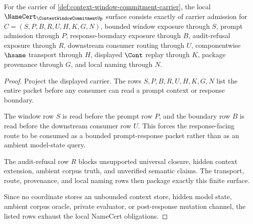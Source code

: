 \begin{theorem}
\label{thm:context-window-commitment-namecert-obligations}
For the carrier of \autoref{def:context-window-commitment-carrier}, the local $\NameCert_{\ContextWindowCommitmentUp}$ surface consists exactly of carrier admission for $C=(S,P,B,R,U,H,K,G,N)$, bounded window exposure through $S$, prompt admission through $P$, response-boundary exposure through $B$, audit-refusal exposure through $R$, downstream consumer routing through $U$, componentwise $\hsame$ transport through $H$, displayed $\Cont$ replay through $K$, package provenance through $G$, and local naming through $N$.
\end{theorem}
\begin{proof}
Project the displayed carrier. The rows $S,P,B,R,U,H,K,G,N$ list the entire packet before any consumer can read a prompt context or response boundary.

The window row $S$ is read before the prompt row $P$, and the boundary row $B$ is read before the downstream consumer row $U$. This forces the response-facing route to be consumed as a bounded prompt-response packet rather than as an ambient model-state query.

The audit-refusal row $R$ blocks unsupported universal closure, hidden context extension, ambient corpus truth, and unverified semantic claims. The transport, route, provenance, and local naming rows then package exactly this finite surface.

Since no coordinate stores an unbounded context store, hidden model state, ambient corpus oracle, private evaluator, or post-response mutation channel, the listed rows exhaust the local NameCert obligations.
\end{proof}

